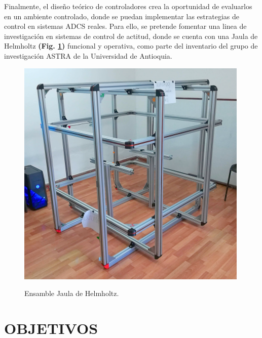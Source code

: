 Finalmente, el diseño teórico de controladores crea la oportunidad de evaluarlos en un ambiente controlado, donde se puedan implementar las estrategias de control en sistemas ADCS reales. Para ello, se pretende fomentar una linea de investigación en sistemas de control de actitud, donde se cuenta con una Jaula de Helmholtz  \textbf{(Fig. \ref{fig:jaula})} funcional y operativa, como parte del inventario del grupo de investigación ASTRA de la Universidad de Antioquia. 

\begin{figure}[!ht]
	\begin{center}
		\includegraphics[scale=0.65]{imagenes/justificacion/jaula.PNG}\\
	\end{center}
	\caption{Ensamble Jaula de Helmholtz.}
	\label{fig:jaula}
\end{figure}


\newpage
\section{OBJETIVOS}

